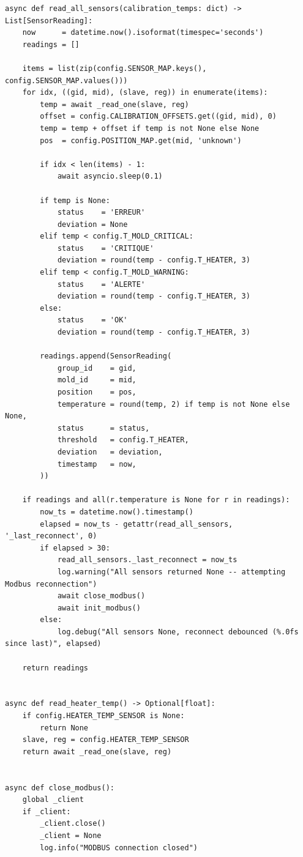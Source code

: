 \begin{lstlisting}
async def read_all_sensors(calibration_temps: dict) -> List[SensorReading]:
    now      = datetime.now().isoformat(timespec='seconds')
    readings = []

    items = list(zip(config.SENSOR_MAP.keys(), config.SENSOR_MAP.values()))
    for idx, ((gid, mid), (slave, reg)) in enumerate(items):
        temp = await _read_one(slave, reg)
        offset = config.CALIBRATION_OFFSETS.get((gid, mid), 0)
        temp = temp + offset if temp is not None else None
        pos  = config.POSITION_MAP.get(mid, 'unknown')

        if idx < len(items) - 1:
            await asyncio.sleep(0.1)

        if temp is None:
            status    = 'ERREUR'
            deviation = None
        elif temp < config.T_MOLD_CRITICAL:
            status    = 'CRITIQUE'
            deviation = round(temp - config.T_HEATER, 3)
        elif temp < config.T_MOLD_WARNING:
            status    = 'ALERTE'
            deviation = round(temp - config.T_HEATER, 3)
        else:
            status    = 'OK'
            deviation = round(temp - config.T_HEATER, 3)

        readings.append(SensorReading(
            group_id    = gid,
            mold_id     = mid,
            position    = pos,
            temperature = round(temp, 2) if temp is not None else None,
            status      = status,
            threshold   = config.T_HEATER,
            deviation   = deviation,
            timestamp   = now,
        ))

    if readings and all(r.temperature is None for r in readings):
        now_ts = datetime.now().timestamp()
        elapsed = now_ts - getattr(read_all_sensors, '_last_reconnect', 0)
        if elapsed > 30:
            read_all_sensors._last_reconnect = now_ts
            log.warning("All sensors returned None -- attempting Modbus reconnection")
            await close_modbus()
            await init_modbus()
        else:
            log.debug("All sensors None, reconnect debounced (%.0fs since last)", elapsed)

    return readings


async def read_heater_temp() -> Optional[float]:
    if config.HEATER_TEMP_SENSOR is None:
        return None
    slave, reg = config.HEATER_TEMP_SENSOR
    return await _read_one(slave, reg)


async def close_modbus():
    global _client
    if _client:
        _client.close()
        _client = None
        log.info("MODBUS connection closed")
\end{lstlisting}

